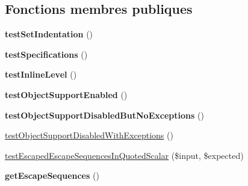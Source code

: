 \subsection*{Fonctions membres publiques}
\begin{DoxyCompactItemize}
\item 
{\bfseries test\+Set\+Indentation} ()\hypertarget{class_symfony_1_1_component_1_1_yaml_1_1_tests_1_1_dumper_test_a9d1210777ab656bc3eb2e9bdc7e52db3}{}\label{class_symfony_1_1_component_1_1_yaml_1_1_tests_1_1_dumper_test_a9d1210777ab656bc3eb2e9bdc7e52db3}

\item 
{\bfseries test\+Specifications} ()\hypertarget{class_symfony_1_1_component_1_1_yaml_1_1_tests_1_1_dumper_test_a40ba0d9bb69b061c9077ddff7ceab79a}{}\label{class_symfony_1_1_component_1_1_yaml_1_1_tests_1_1_dumper_test_a40ba0d9bb69b061c9077ddff7ceab79a}

\item 
{\bfseries test\+Inline\+Level} ()\hypertarget{class_symfony_1_1_component_1_1_yaml_1_1_tests_1_1_dumper_test_a311cfeee056148bac83c45e7a572bfc4}{}\label{class_symfony_1_1_component_1_1_yaml_1_1_tests_1_1_dumper_test_a311cfeee056148bac83c45e7a572bfc4}

\item 
{\bfseries test\+Object\+Support\+Enabled} ()\hypertarget{class_symfony_1_1_component_1_1_yaml_1_1_tests_1_1_dumper_test_a57928b695e7198894d7d584c32715a9e}{}\label{class_symfony_1_1_component_1_1_yaml_1_1_tests_1_1_dumper_test_a57928b695e7198894d7d584c32715a9e}

\item 
{\bfseries test\+Object\+Support\+Disabled\+But\+No\+Exceptions} ()\hypertarget{class_symfony_1_1_component_1_1_yaml_1_1_tests_1_1_dumper_test_af91b4bceeb3a35225c1b4c44c7638375}{}\label{class_symfony_1_1_component_1_1_yaml_1_1_tests_1_1_dumper_test_af91b4bceeb3a35225c1b4c44c7638375}

\item 
\hyperlink{class_symfony_1_1_component_1_1_yaml_1_1_tests_1_1_dumper_test_aaf0de7d76950be31f7fb32b9b15333b2}{test\+Object\+Support\+Disabled\+With\+Exceptions} ()
\item 
\hyperlink{class_symfony_1_1_component_1_1_yaml_1_1_tests_1_1_dumper_test_a641c14721403d6dfa39fd8d27abd2b4d}{test\+Escaped\+Escape\+Sequences\+In\+Quoted\+Scalar} (\$input, \$expected)
\item 
{\bfseries get\+Escape\+Sequences} ()\hypertarget{class_symfony_1_1_component_1_1_yaml_1_1_tests_1_1_dumper_test_a85925167fbf83c4bb9fefb0ba5705ab4}{}\label{class_symfony_1_1_component_1_1_yaml_1_1_tests_1_1_dumper_test_a85925167fbf83c4bb9fefb0ba5705ab4}

\end{DoxyCompactItemize}

